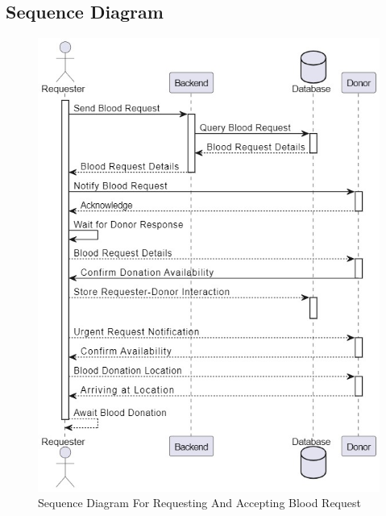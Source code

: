 \subsection{Sequence Diagram}
\begin{figure}[hbt!]
    \centering
     \includegraphics[width=145mm]{images/sequential.jpg}
    \caption{Sequence Diagram For Requesting And Accepting Blood Request}
    \label{fig:Sequence Diagram}
\end{figure}
